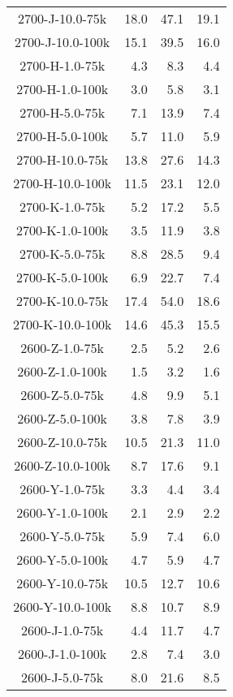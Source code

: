 \begin{longtable}{crrr}
    2700-J-10.0-75k  &   18.0 &   47.1 &   19.1 \\
    2700-J-10.0-100k &   15.1 &   39.5 &   16.0 \\
    2700-H-1.0-75k   &    4.3 &    8.3 &    4.4 \\
    2700-H-1.0-100k  &    3.0 &    5.8 &    3.1 \\
    2700-H-5.0-75k   &    7.1 &   13.9 &    7.4 \\
    2700-H-5.0-100k  &    5.7 &   11.0 &    5.9 \\
    2700-H-10.0-75k  &   13.8 &   27.6 &   14.3 \\
    2700-H-10.0-100k &   11.5 &   23.1 &   12.0 \\
    2700-K-1.0-75k   &    5.2 &   17.2 &    5.5 \\
    2700-K-1.0-100k  &    3.5 &   11.9 &    3.8 \\
    2700-K-5.0-75k   &    8.8 &   28.5 &    9.4 \\
    2700-K-5.0-100k  &    6.9 &   22.7 &    7.4 \\
    2700-K-10.0-75k  &   17.4 &   54.0 &   18.6 \\
    2700-K-10.0-100k &   14.6 &   45.3 &   15.5 \\
    2600-Z-1.0-75k   &    2.5 &    5.2 &    2.6 \\
    2600-Z-1.0-100k  &    1.5 &    3.2 &    1.6 \\
    2600-Z-5.0-75k   &    4.8 &    9.9 &    5.1 \\
    2600-Z-5.0-100k  &    3.8 &    7.8 &    3.9 \\
    2600-Z-10.0-75k  &   10.5 &   21.3 &   11.0 \\
    2600-Z-10.0-100k &    8.7 &   17.6 &    9.1 \\
    2600-Y-1.0-75k   &    3.3 &    4.4 &    3.4 \\
    2600-Y-1.0-100k  &    2.1 &    2.9 &    2.2 \\
    2600-Y-5.0-75k   &    5.9 &    7.4 &    6.0 \\
    2600-Y-5.0-100k  &    4.7 &    5.9 &    4.7 \\
    2600-Y-10.0-75k  &   10.5 &   12.7 &   10.6 \\
    2600-Y-10.0-100k &    8.8 &   10.7 &    8.9 \\
    2600-J-1.0-75k   &    4.4 &   11.7 &    4.7 \\
    2600-J-1.0-100k  &    2.8 &    7.4 &    3.0 \\
    2600-J-5.0-75k   &    8.0 &   21.6 &    8.5 \\

\end{longtable}

